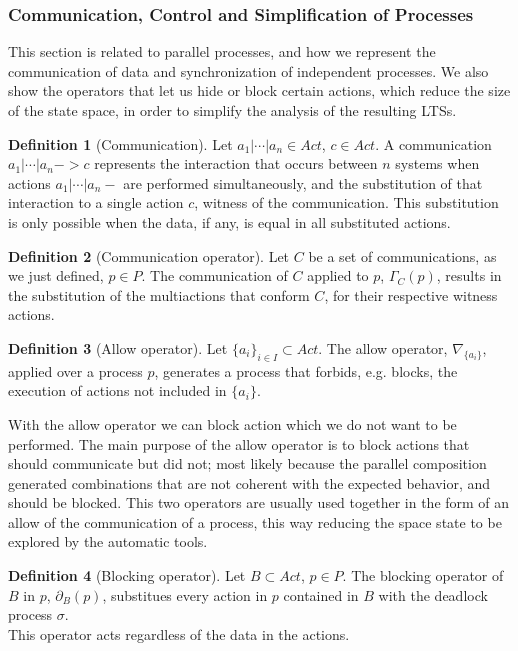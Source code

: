 \documentclass[11pt]{article}
\theoremstyle{definition}
\newtheorem{definition}{Definition}
\theoremstyle{plain}
\theoremstyle{definition}
\begin{document}
\subsubsection{Communication, Control and Simplification of Processes}
This section is related to parallel processes, and how we represent the communication of data and synchronization of independent processes. We also show the operators that let us hide or block certain actions, which reduce the size of the state space, in order to simplify the analysis of the resulting LTSs.
\begin{definition} [Communication]
	Let $ a_1 \vert \cdots \vert a_n \in Act$, $ c \in Act$. A communication $ a_1 \vert \cdots \vert a_n->c  $ represents the interaction that occurs between $ n $ systems when actions $ a_1 \vert \cdots \vert a_n- $ are performed simultaneously, and the substitution of that interaction to a single action $ c $, witness of the communication. This substitution is only possible when the data, if any, is equal in all substituted actions.
\end{definition}
\begin{definition} [Communication operator]
	Let $ C $ be a set of communications, as we just defined, $ p \in P $. The communication of $ C $ applied to $ p $, $ \Gamma_{C}(p) $, results in the substitution of the multiactions that conform $ C $, for their respective witness actions.
\end{definition}

\begin{definition}[Allow operator]
	Let $ \big\{a_i\big\}_{i \in I} \subset Act$. The allow operator, $ \nabla_{\big\{a_i\big\}} $, applied over a process $ p $, generates a process that forbids, e.g. blocks, the execution of actions not included in $ \big\{a_i\big\} $.
\end{definition}
With the allow operator we can block action which we do not want to be performed. The main purpose of the allow operator is to block actions that should communicate but did not; most likely because the parallel composition generated combinations that are not coherent with the expected behavior, and should be blocked.
This two operators are usually used together in the form of an allow of the communication of a process, this way reducing the space state to be explored by the automatic tools.
\begin{definition}[Blocking operator]
	Let $ B \subset Act $, $ p \in P $. The blocking operator of $ B $ in $ p $, $ \partial_B(p) $, substitues every action in $ p $ contained in $ B $ with the deadlock process $ \sigma $. \\
	This operator acts regardless of the data in the actions.
\end{definition}
\end{document}
